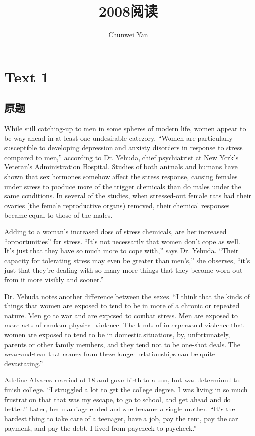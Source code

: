 \documentclass[a4paper]{ctexart}
\author{Chunwei Yan}
\title{2008阅读}
\begin{document}
    \maketitle
\section{Text 1}
\subsection{原题}
While still catching-up to men in some spheres of modern life, women appear to be way ahead in at least one undesirable category. “Women are particularly susceptible to developing depression and anxiety disorders in response to stress compared to men,” according to Dr. Yehuda, chief psychiatrist at New York’s Veteran’s Administration Hospital.
Studies of both animals and humans have shown that sex hormones somehow affect the stress response, causing females under stress to produce more of the trigger chemicals than do males under the same conditions. In several of the studies, when stressed-out female rats had their ovaries (the female reproductive organs) removed, their chemical responses became equal to those of the males.
\par
Adding to a woman’s increased dose of stress chemicals, are her increased “opportunities” for stress. “It’s not necessarily that women don’t cope as well. It’s just that they have so much more to cope with,” says Dr. Yehuda. “Their capacity for tolerating stress may even be greater than men’s,” she observes, “it’s just that they’re dealing with so many more things that they become worn out from it more visibly and sooner.”
\par
Dr. Yehuda notes another difference between the sexes. “I think that the kinds of things that women are exposed to tend to be in more of a chronic or repeated nature. Men go to war and are exposed to combat stress. Men are exposed to more acts of random physical violence. The kinds of interpersonal violence that women are exposed to tend to be in domestic situations, by, unfortunately, parents or other family members, and they tend not to be one-shot deals. The wear-and-tear that comes from these longer relationships can be quite devastating.”
\par
Adeline Alvarez married at 18 and gave birth to a son, but was determined to finish college. “I struggled a lot to get the college degree. I was living in so much frustration that that was my escape, to go to school, and get ahead and do better.” Later, her marriage ended and she became a single mother. “It’s the hardest thing to take care of a teenager, have a job, pay the rent, pay the car payment, and pay the debt. I lived from paycheck to paycheck.”
\end{document}
